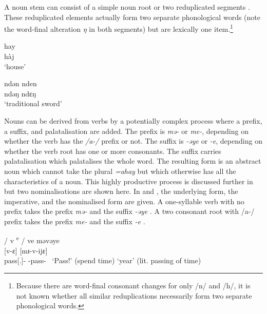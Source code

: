 \largerpage A noun stem can consist of a simple noun root  or two reduplicated segments . These reduplicated elements actually form two separate phonological words (note the word-final alteration \textit{ŋ} in both segments) but are lexically one item.\footnote{Because there are word-final consonant changes for only /n/ and /h/, it is not known whether all similar reduplications necessarily form two separate phonological words.} 


\ea \label{ex:4:16}
hay\\
  hàj\\
\glt  ‘house’
\z

\ea \label{ex:4:17}
ndən nden\\
  ndəŋ ndɛŋ\\
\glt  ‘traditional sword’
\z

Nouns can be derived from verbs by a potentially complex process where a prefix, a suffix, and palatalisation are added. The prefix is \textit{mə-} or \textit{me-}, depending on whether the verb has the \textit{/a-/} prefix or not. The suffix is \textit{-əye} or \textit{-e}, depending on whether the verb root has one or more consonants. The suffix carries palatalisation which palatalises the whole word. The resulting form is an abstract noun which cannot take the plural \textit{=ahay} but which otherwise has all the characteristics of a noun. This highly productive process is discussed further in  but two nominalisations are shown here. In  and , the underlying form, the {\twoS} imperative, and the nominalised form are given. A one-syllable verb with no prefix takes the prefix \textit{mə-} and the suffix \textit{{}-əye} . A two consonant root with /a-/ prefix takes the prefix \textit{me-} and the suffix \textit{{}-e} .

\ea \label{ex:4:18}
\textup{/ v \textsuperscript{e} / \hspace{30pt} ve  \hspace{82pt}    məvəye}\\
\hspace{55pt} [v-ɛ]  \hspace{74pt}    [mɪ-v-ijɛ]\\
\hspace{55pt}      pass[{\twoS}.{\IMP}]-{\CL} \hspace{27pt} {\NOM}{}-pass-{\CL}\
\glt \hspace{55pt} ‘Pass!’ (spend time) \hspace{10pt} ‘year’ (lit. passing of time)
\z

